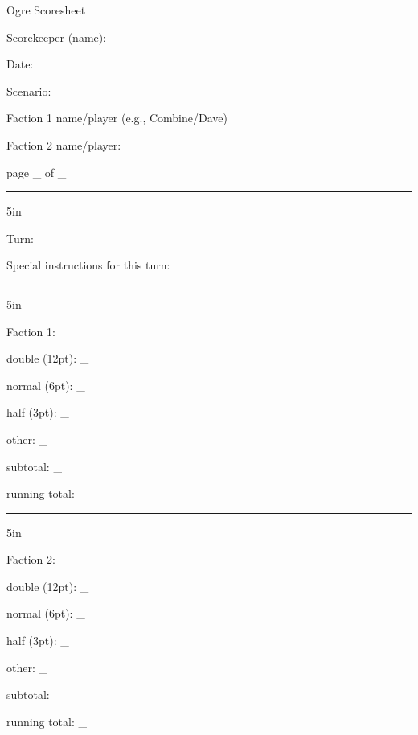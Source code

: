 \documentclass[10pt]{article}
\begin{document}
Ogre Scoresheet

Scorekeeper (name):

Date:

Scenario:

Faction 1 name/player (e.g., Combine/Dave)

Faction 2 name/player:

page \_ of \_

\hrule{5in}

Turn: \_

Special instructions for this turn:

\hrule{5in}

Faction 1:

double (12pt): \_

normal (6pt): \_

half (3pt): \_

other: \_

subtotal: \_

running total: \_

\hrule{5in}

Faction 2:

double (12pt): \_

normal (6pt): \_

half (3pt): \_

other: \_

subtotal: \_

running total: \_
\end{document}
